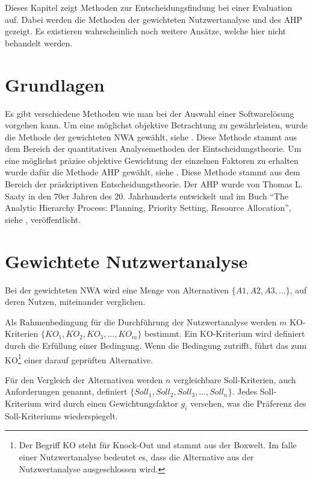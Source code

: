  Dieses Kapitel zeigt Methoden zur Entscheidungsfindung bei einer Evaluation
  auf. Dabei werden die Methoden der gewichteten Nutzwertanalyse und des
  \ac{AHP} gezeigt. Es existieren wahrscheinlich noch weitere Ansätze, welche
  hier nicht behandelt werden.
  
  \section{Grundlagen}
  
  Es gibt verschiedene Methoden wie man bei der Auswahl einer Softwarelösung
  vorgehen kann. Um eine möglichst objektive Betrachtung zu gewährleisten, wurde
  die Methode der gewichteten \ac{NWA} gewählt, siehe \cite{Nutzwertanalyse}.
  Diese Methode stammt aus dem Bereich der quantitativen Analysemethoden der
  Eintscheidungstheorie. Um eine möglichst präzise objektive Gewichtung der
  einzelnen Faktoren zu erhalten wurde dafür die Methode \ac{AHP} gewählt,
  siehe \cite{AnalyticHierarchyProcess}. Diese Methode stammt aus dem Bereich
  der präskriptiven Entscheidungstheorie. Der \ac{AHP} wurde von Thomas L.
  Saaty in den 70er Jahren des 20. Jahrhunderts entwickelt und im Buch ``The
  Analytic Hierarchy Process: Planning, Priority Setting, Resource
  Allocation'', siehe \cite{AnalyticHierarchyProcessBook}, veröffentlicht.
  
  \section{Gewichtete Nutzwertanalyse}
  
  Bei der gewichteten \ac{NWA} wird eine Menge von Alternativen \(\{A1, A2,
  A3, \ldots\}\), auf deren Nutzen, miteinander verglichen.
  
  Als Rahmenbedingung für die Durchführung der Nutzwertanalyse werden \(m\)
  KO-Kriterien \(\{KO_1, KO_2, KO_3, \ldots, KO_m\}\) bestimmt. Ein
  KO-Kriterium wird definiert durch die Erfüllung einer Bedingung. Wenn die Bedingung
  zutrifft, führt das zum KO\footnote{Der Begriff KO steht für Knock-Out und
  stammt aus der Boxwelt. Im falle einer Nutzwertanalyse bedeutet es, dass die
  Alternative aus der Nutzwertanalyse ausgeschlossen wird.} einer darauf
  geprüften Alternative.
  
  Für den Vergleich der Alternativen werden \(n\) vergleichbare
  Soll-Kriterien, auch Anforderungen genannt, definiert \(\{Soll_1, Soll_2,
  Soll_3, \ldots, Soll_n\}\). Jedes Soll-Kriterium wird durch einen
  Gewichtungsfaktor \(g_i\) versehen, was die Präferenz des Soll-Kriteriums
  wiederspiegelt. 

